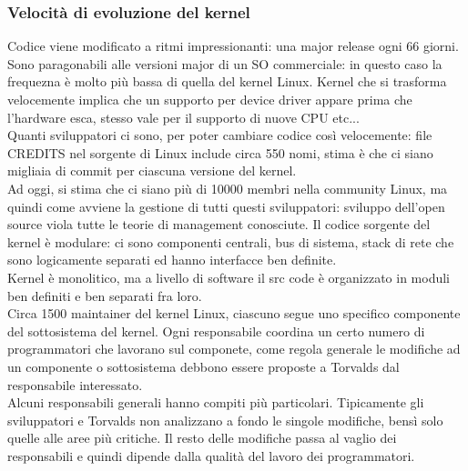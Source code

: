 \documentclass{article}
\begin{document}
\subsubsection{Velocità di evoluzione del kernel}
Codice viene modificato a ritmi impressionanti: una major release ogni 66 giorni. Sono paragonabili alle versioni major di un SO commerciale: in questo caso la frequezna è molto più bassa di quella del kernel Linux. Kernel che si trasforma velocemente implica che un supporto per device driver appare prima che l'hardware esca, stesso vale per il supporto di nuove CPU etc...\\ Quanti sviluppatori ci sono, per poter cambiare codice così velocemente: file CREDITS nel sorgente di Linux include circa 550 nomi, stima è  che ci siano migliaia di commit per ciascuna versione del kernel.\\ Ad oggi, si stima che ci siano più di 10000 membri nella community Linux, ma quindi come avviene la gestione di tutti  questi sviluppatori: sviluppo dell'open source viola tutte le teorie di management conosciute. Il codice sorgente del kernel è modulare: ci sono componenti centrali, bus di sistema, stack di rete che sono logicamente separati ed hanno interfacce ben definite.\\ Kernel è monolitico, ma a livello di software il src code è organizzato in moduli ben definiti e ben separati fra loro.\\ Circa 1500 maintainer del kernel Linux, ciascuno segue uno specifico componente del sottosistema del kernel. Ogni responsabile coordina un certo numero di programmatori che lavorano sul componete, come regola generale le modifiche ad un componente o sottosistema debbono essere proposte a Torvalds dal responsabile interessato.\\ Alcuni responsabili generali hanno compiti più particolari. Tipicamente gli sviluppatori e Torvalds non analizzano a fondo le singole modifiche, bensì solo quelle alle aree più critiche. Il resto delle modifiche passa al vaglio dei responsabili e quindi dipende dalla qualità del lavoro dei programmatori.
\end{document}

